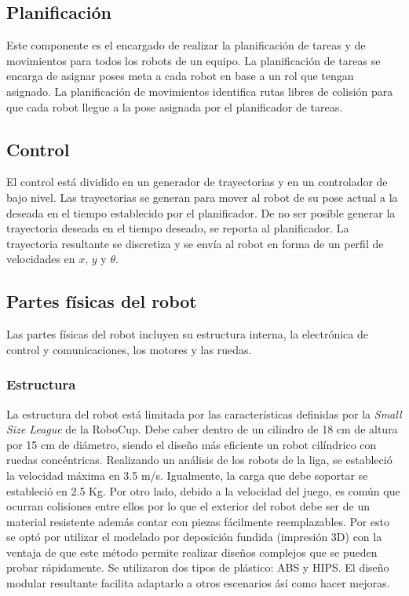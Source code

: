 \documentclass[twocolumn,10pt]{amrob}
\begin{document}
\subsection*{Planificación}
Este componente es el encargado de realizar la planificación de tareas y de movimientos para todos los robots de un equipo. La planificación de tareas se encarga de asignar poses meta a cada robot en base a un rol que tengan asignado. La planificación de movimientos identifica rutas libres de colisión para que cada robot llegue a la pose asignada por el planificador de tareas.
\subsection*{Control}
El control está dividido en un generador de trayectorias y en un controlador de bajo nivel. Las trayectorias se generan para mover al robot de su pose actual a la deseada en el tiempo establecido por el planificador. De no ser posible generar la trayectoria deseada en el tiempo deseado, se reporta al planificador. La trayectoria resultante se discretiza y se envía al robot en forma de un perfil de velocidades en $x$, $y$ y $\theta$. 
 
\subsection*{Partes físicas del robot}
Las partes físicas del robot incluyen su estructura interna, la electrónica de control y comunicaciones, los motores y las ruedas.

\subsubsection*{Estructura} La estructura del robot está limitada por las características definidas por la \textit{Small Size League} de la RoboCup. Debe caber dentro de un cilindro de 18 cm de altura por 15 cm de diámetro, siendo el diseño más eficiente un robot cilíndrico con ruedas concéntricas.
Realizando un análisis de los robots de la liga, se estableció la velocidad máxima en 3.5 m/s. Igualmente, la carga que debe soportar se estableció en 2.5 Kg. Por otro lado, debido a la velocidad del juego, es común que ocurran colisiones entre ellos por lo que el exterior del robot debe ser de un material resistente además contar con piezas fácilmente reemplazables. Por esto se optó por utilizar el modelado por deposición fundida (impresión 3D) con la ventaja de que este método permite realizar diseños complejos que se pueden probar rápidamente. Se utilizaron dos tipos de plástico: ABS y HIPS. El diseño modular resultante facilita adaptarlo a otros escenarios ásí como hacer mejoras. 
\end{document}
